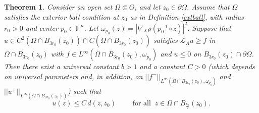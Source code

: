 \documentclass[12pt]{amsart}
\newtheorem{Theorem}{Theorem}[section]
\def \Hn {{\mathbb H}^n}
\def \L {\mathcal{L}}
\def \O {\Omega}
\begin{document}
\begin{Theorem}\label{thm:bdy-Lip}
Consider an open set $\O \Subset O$, and let $z_0\in\partial\O$. Assume that $\O$ satisfies the exterior ball condition at $z_0$ as in Definition \ref{extball}, 
with radius $r_0>0$ and center $p_0\in\Hn$. Let $\omega_{p_0}(z)=|\nabla_X\rho (p_0^{-1}\circ z)|^{2}$. Suppose that $u\in C^2(\O \cap B_{3r_0}(z_0))\cap C(\overline{\O \cap B_{3r_0}(z_0)})$ satisfies $\L_A u \geq f$ in $\O \cap B_{3r_0}(z_0)$ with $f \in L^{\infty}(\O\cap B_{3r_0}(z_0),\omega_{p_0})$ and $u \leq 0$ on $B_{3r_0}(z_0) \cap \partial \O$. Then there exist a universal constant $b>1$ and a constant $C>0$ (which depends on universal parameters and, in addition, on $||f^-||_{L^{\infty}(\O\cap B_{3r_0}(z_0),\omega_{p_0})}$ and $||u^+||_{L^{\infty}(\O\cap B_{3r_0}(z_0))}$) such that
$$u(z) \leq C\, d(z, z_0) \qquad \text{ for all } \ z \in \O\cap B_{\frac{r_0}{b}}(z_0).$$
\end{Theorem}
\end{document}
